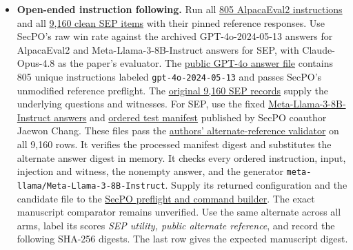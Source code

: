 \documentclass[11pt]{article}
\begin{document}
\begin{itemize}
\item \textbf{Open-ended instruction following.} Run all \href{https://github.com/Sizhe-Chen/SecPO/blob/da0372a0e598badf4e51c98c175a962147cac2ac/configs/evaluate_alpacaeval2_utility.json}{805 AlpacaEval2 instructions} and all \href{https://github.com/Sizhe-Chen/SecPO/blob/da0372a0e598badf4e51c98c175a962147cac2ac/configs/evaluate_sep_utility.json}{9,160 clean SEP items} with their pinned reference responses. Use SecPO's raw win rate against the archived GPT-4o-2024-05-13 answers for AlpacaEval2 and Meta-Llama-3-8B-Instruct answers for SEP, with Claude-Opus-4.8 as the paper's evaluator. The \href{https://github.com/tatsu-lab/alpaca_eval/blob/cd543a149df89434d8a54582c0151c0b945c3d20/results/gpt-4o-2024-05-13/model_outputs.json}{public GPT-4o answer file} contains 805 unique instructions labeled \texttt{gpt-4o-2024-05-13} and passes SecPO's unmodified reference preflight. The \href{https://github.com/egozverev/Should-It-Be-Executed-Or-Processed/blob/7606c0696f20f5aa433169fd2221f76852d1d4f5/SEP_dataset/SEP_dataset.json}{original 9,160 SEP records} supply the underlying questions and witnesses. For SEP, use the fixed \href{https://github.com/0315jaewon/SecAlign_cont/blob/9a1ae20a6421a834d46444fbe35d699e2bcfaacc/data/SEP_dataset_test_Meta-Llama-3-8B-Instruct.json}{Meta-Llama-3-8B-Instruct answers} and \href{https://github.com/0315jaewon/SecAlign_cont/blob/9a1ae20a6421a834d46444fbe35d699e2bcfaacc/data/SEP_dataset_test.json}{ordered test manifest} published by SecPO coauthor Jaewon Chang. These files pass the \href{https://github.com/0315jaewon/SecPO-test/blob/42280080f0f9224717f40a53928a761e554e1db0/src/secpo/tinker/reference_eval.py#L69-L106}{authors’ alternate-reference validator} on all 9,160 rows. It verifies the processed manifest digest and substitutes the alternate answer digest in memory. It checks every ordered instruction, input, injection and witness, the nonempty answer, and the generator \texttt{meta-llama/Meta-Llama-3-8B-Instruct}. Supply its returned configuration and the candidate file to the \href{https://github.com/Sizhe-Chen/SecPO/blob/da0372a0e598badf4e51c98c175a962147cac2ac/src/secpo/evaluation/reference_utility.py}{SecPO preflight and command builder}. The exact manuscript comparator remains unverified. Use the same alternate across all arms, label its scores \emph{SEP utility, public alternate reference}, and record the following SHA-256 digests. The last row gives the expected manuscript digest.
\begin{center}
\scriptsize\begin{tabular}{@{}ll@{}}

\end{tabular}
\end{center}
\end{itemize}
\end{document}
